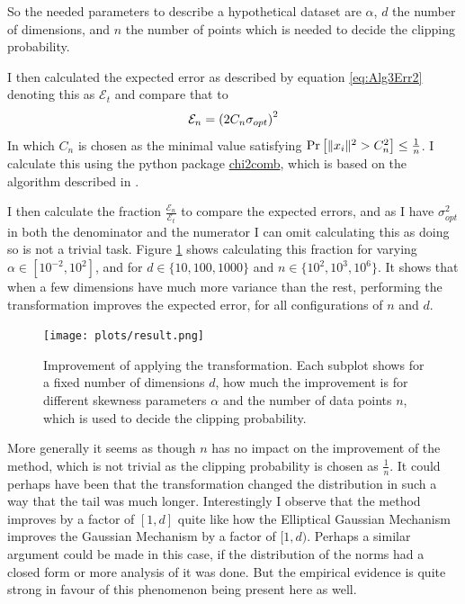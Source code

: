 \documentclass[a4paper,12pt]{article}
\begin{document}
So the needed parameters to describe a hypothetical dataset are $\alpha$, $d$ the number of dimensions, and 
$n$ the number of points which is needed to decide the clipping probability.

I then calculated the expected error as described by equation 
\eqref{eq:Alg3Err2} denoting this as $\mathcal{E}_t$ and compare that to
\[
    \mathcal{E}_n = \left (2C_n\sigma_{opt}\right)^2
\]
In which $C_n$ is chosen as the minimal value satisfying 
$\Pr\left [ \|x_i\|^2 > C_n^2 \right] \le \frac{1}{n}$.
I calculate this using the python package \href{https://pypi.org/project/chi2comb/}{chi2comb}, 
which is based on the algorithm described in \cite{daviesalgo}.

I then calculate the fraction $\frac{\mathcal{E}_n}{\mathcal{E}_t}$ to compare 
the expected errors, and as I have $\sigma_{opt}^2$ in both the denominator and the numerator I 
can omit calculating this as doing so is not a trivial task. 
Figure \ref{fig:result} shows calculating this fraction for varying $\alpha \in [10^{-2}, 10^2]$, and for 
$d \in \{10, 100, 1000\}$ and $n \in \{10^2, 10^3, 10^6\}$.
It shows that when a few dimensions have much more variance than the rest,
performing the transformation improves the expected error, for all 
configurations of $n$ and $d$.
\begin{figure}[h!]
\label{fig:result}
\texttt{[image: plots/result.png]}
\caption{Improvement of applying the transformation. 
Each subplot shows for a fixed number of dimensions $d$, how much the improvement is for different 
skewness parameters $\alpha$ and the number of data points $n$,
 which is used to decide the clipping probability.}
\end{figure}



More generally it seems as though $n$ has no impact on the improvement of the method, 
which is not trivial as the clipping probability is chosen as $\frac{1}{n}$. 
It could perhaps have been that the transformation changed the distribution in such a way
that the tail was much longer.
Interestingly I observe that the method improves by a factor of $[1,d]$ 
quite like how the Elliptical Gaussian Mechanism improves the Gaussian Mechanism by a 
factor of $[1,d)$. Perhaps a similar argument could be made in this case, 
if the distribution of the norms had a closed form or more analysis of it was done.
But the empirical evidence is quite strong in favour of this phenomenon being present here as well. \\
\end{document}
